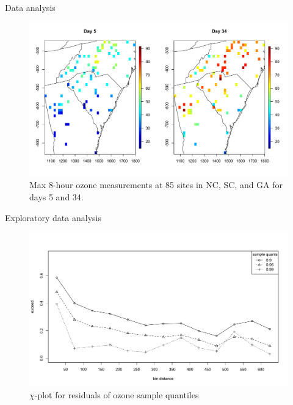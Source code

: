 \documentclass{beamer}
\begin{document}
\begin{frame}{Data analysis}
  \centering
  \begin{figure}
    \includegraphics[width=1\linewidth]{./plots/ozone-day.pdf}
    \caption{Max 8-hour ozone measurements at 85 sites in NC, SC, and GA for days 5 and 34.}
   \end{figure}

\end{frame}

\begin{frame}{Exploratory data analysis}
	\centering
  \begin{figure}
    \includegraphics[width=1\linewidth]{./plots/chi-plot-ozone-res.pdf}
    \caption{$\chi$-plot for residuals of ozone sample quantiles}
  \end{figure}
\end{frame}
\end{document}
